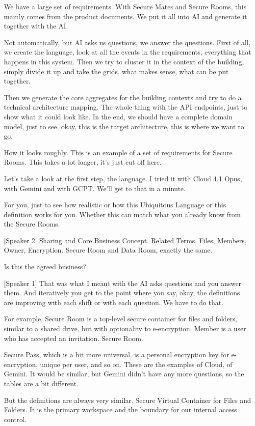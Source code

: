 We have a large set of requirements. With Secure Mates and Secure Rooms, this mainly comes from the product documents. We put it all into AI and generate it together with the AI.

Not automatically, but AI asks us questions, we answer the questions. First of all, we create the language, look at all the events in the requirements, everything that happens in this system. Then we try to cluster it in the context of the building, simply divide it up and take the grids, what makes sense, what can be put together.

Then we generate the core aggregates for the building contexts and try to do a technical architecture mapping. The whole thing with the API endpoints, just to show what it could look like. In the end, we should have a complete domain model, just to see, okay, this is the target architecture, this is where we want to go.

How it looks roughly. This is an example of a set of requirements for Secure Rooms. This takes a lot longer, it's just cut off here.

Let's take a look at the first step, the language. I tried it with Cloud 4.1 Opus, with Gemini and with GCPT. We'll get to that in a minute.

For you, just to see how realistic or how this Ubiquitous Language or this definition works for you. Whether this can match what you already know from the Secure Rooms.

[Speaker 2]
Sharing and Core Business Concept. Related Terms, Files, Members, Owner, Encryption. Secure Room and Data Room, exactly the same.

Is this the agreed business?

[Speaker 1]
That was what I meant with the AI asks questions and you answer them. And iteratively you get to the point where you say, okay, the definitions are improving with each shift or with each question. We have to do that.

For example, Secure Room is a top-level secure container for files and folders, similar to a shared drive, but with optionality to e-encryption. Member is a user who has accepted an invitation. Secure Room.

Secure Pass, which is a bit more universal, is a personal encryption key for e-encryption, unique per user, and so on. These are the examples of Cloud, of Gemini. It would be similar, but Gemini didn't have any more questions, so the tables are a bit different.

But the definitions are always very similar. Secure Virtual Container for Files and Folders. It is the primary workspace and the boundary for our internal access control.

